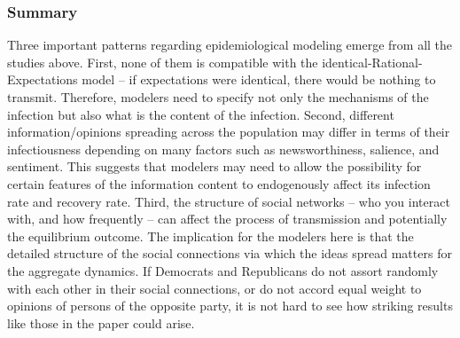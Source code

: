  \subsubsection{Summary}
 Three important patterns regarding epidemiological modeling emerge from all the studies above.  First, none of them is compatible with the identical-Rational-Expectations model -- if expectations were identical, there would be nothing to transmit. Therefore, modelers need to specify not only the mechanisms of the infection but also what is the content of the infection.   Second, different information/opinions spreading across the population may differ in terms of their infectiousness depending on many factors such as newsworthiness, salience, and sentiment. This suggests that modelers may need to allow the possibility for certain features of the information content to endogenously affect its infection rate and recovery rate.  Third, the structure of social networks -- who you interact with, and how frequently -- can affect the process of transmission and potentially the equilibrium outcome.  The implication for the modelers here is that the detailed structure of the social connections via which the ideas spread matters for the aggregate dynamics.
 If Democrats and Republicans do not assort randomly with each other in their social connections, or do not accord equal weight to opinions of persons of the opposite party, it is not hard to see how striking results like those in the \cite{meeuwis2018belief} paper could arise.

